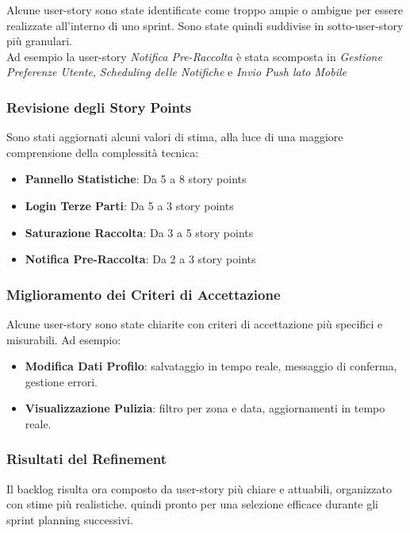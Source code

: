 Alcune user-story sono state identificate come troppo ampie o ambigue per essere realizzate all’interno di uno sprint. Sono state quindi suddivise in sotto-user-story più granulari. \\ Ad esempio la user-story \textit{Notifica Pre-Raccolta} è stata scomposta in \textit{Gestione Preferenze Utente}, \textit{Scheduling delle Notifiche} e \textit{Invio Push lato Mobile}

\subsubsection{Revisione degli Story Points}

Sono stati aggiornati alcuni valori di stima, alla luce di una maggiore comprensione della complessità tecnica:

\begin{itemize}
  \item \textbf{Pannello Statistiche}: Da 5 a 8 story points
  \item \textbf{Login Terze Parti}: Da 5 a 3 story points
  \item \textbf{Saturazione Raccolta}: Da 3 a 5 story points
  \item \textbf{Notifica Pre-Raccolta}: Da 2 a 3 story points
\end{itemize}

\subsubsection{Miglioramento dei Criteri di Accettazione}

Alcune user-story sono state chiarite con criteri di accettazione più specifici e misurabili. Ad esempio:
\begin{itemize}
  \item \textbf{Modifica Dati Profilo}: salvataggio in tempo reale, messaggio di conferma, gestione errori.
  \item \textbf{Visualizzazione Pulizia}: filtro per zona e data, aggiornamenti in tempo reale.
\end{itemize}

\subsubsection{Risultati del Refinement}
Il backlog risulta ora composto da user-story più chiare e attuabili, organizzato con stime più realistiche. quindi pronto per una selezione efficace durante gli sprint planning successivi.


